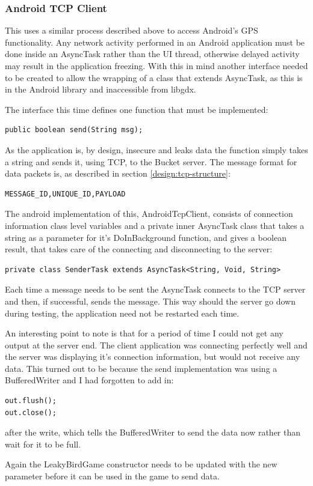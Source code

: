 \subsubsection{Android TCP Client}
This uses a similar process described above to access Android’s GPS functionality. Any network activity performed in an Android application must be done inside an AsyncTask rather than the UI thread, otherwise delayed activity may result in the application freezing. With this in mind another interface needed to be created to allow the wrapping of a class that extends AsyncTask, as this is in the Android library and inaccessible from libgdx.

The interface this time defines one function that must be implemented:
\begin{verbatim}
public boolean send(String msg);
\end{verbatim}

As the application is, by design, insecure and leaks data the function simply takes a string and sends it, using TCP, to the Bucket server. The message format for data packets is, as described in section \ref{design:tcp-structure}:
\begin{verbatim}
MESSAGE_ID,UNIQUE_ID,PAYLOAD
\end{verbatim}

The android implementation of this, AndroidTcpClient, consists of connection information class level variables and a private inner AsyncTask class that takes a string as a parameter for it’s DoInBackground function, and gives a boolean result, that takes care of the connecting and disconnecting to the server:

\begin{verbatim}
private class SenderTask extends AsyncTask<String, Void, String>
\end{verbatim}

Each time a message needs to be sent the AsyncTask connects to the TCP server and then, if successful, sends the message. This way should the server go down during testing, the application need not be restarted each time.
 
An interesting point to note is that for a period of time I could not get any output at the server end. The client application was connecting perfectly well and the server was displaying it’s connection information, but would not receive any data. This turned out to be because the send implementation was using a BufferedWriter and I had forgotten to add in:

\begin{verbatim}
out.flush();
out.close();
\end{verbatim}

after the write, which tells the BufferedWriter to send the data now rather than wait for it to be full.

Again the LeakyBirdGame constructor needs to be updated with the new parameter before it can be used in the game to send data.
\clearpage